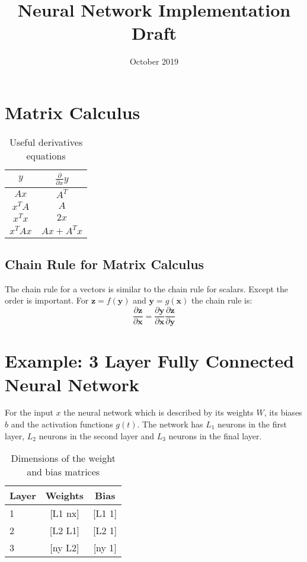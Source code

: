 \documentclass[11pt]{article}
\title{Neural Network Implementation Draft}
\date{October 2019}
\begin{document}
\maketitle

\section{Matrix Calculus}

\begin{table}
    \centering
    \begin{tabular}{cc}
        \toprule
            $y$ & $\frac{\partial}{\partial x} y$ \\
        \midrule
            $Ax$     & $A^T$ \\
            $x^T A$  & $A$   \\
            $x^T x$  & $2x$  \\  
            $x^T Ax$ & $Ax + A^Tx$  \\          
        \bottomrule
    \end{tabular}
    \caption{Useful derivatives equations}
\end{table}

\subsection{Chain Rule for Matrix Calculus}

The chain rule for a vectors is similar to the chain rule for scalars. Except the order is important. For $\mathbf{z} = f(\mathbf{y})$ and $\mathbf{y} = g(\mathbf{x}) $ the chain rule is:
\begin{equation}
    \frac{\partial \mathbf{z}}{\partial \mathbf{x}} = \frac{\partial \mathbf{y}}{\partial \mathbf{x}}     \frac{\partial \mathbf{z}}{\partial \mathbf{y}}
\end{equation}

\section{Example: 3 Layer Fully Connected Neural Network}

For the input $x$ the neural network which is described by its weights $W$, its biases $b$ and the activation functions $g(t)$. The network has $L_1$ neurons in the first layer, $L_2$ neurons in the second layer and $L_3$ neurons in the final layer.

\begin{table}
    \centering
    \begin{tabular}{lcc}
        \toprule
            Layer & Weights & Bias \\
        \midrule
            1     & [L1 nx] & [L1 1] \\
            2     & [L2 L1] & [L2 1] \\
            3     & [ny L2] & [ny 1] \\
        \bottomrule
    \end{tabular}
    \caption{Dimensions of the weight and bias matrices}
\end{table}
\end{document}
